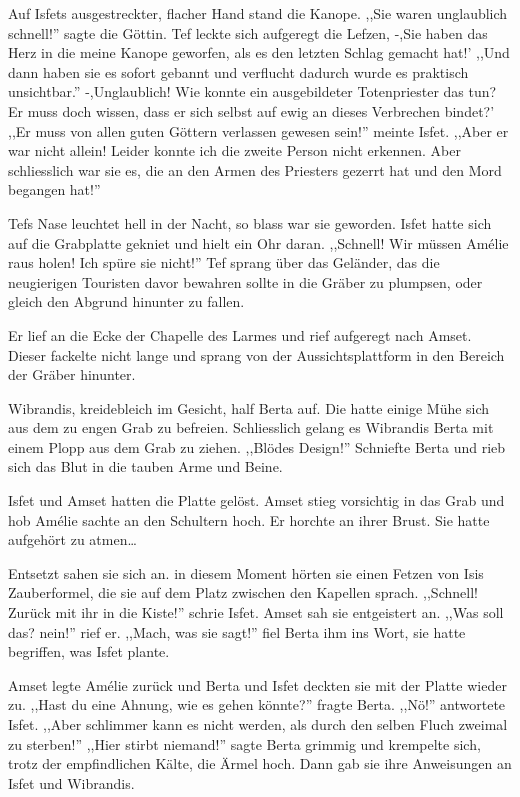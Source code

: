 Auf Isfets ausgestreckter, flacher Hand stand die Kanope. ,,Sie waren unglaublich schnell!'' sagte die Göttin. Tef leckte sich aufgeregt die Lefzen, -,Sie haben das Herz in die meine Kanope geworfen, als es den letzten Schlag gemacht hat!' ,,Und dann haben sie es sofort gebannt und verflucht dadurch wurde es praktisch unsichtbar.'' -,Unglaublich! Wie konnte ein ausgebildeter Totenpriester das tun? Er muss doch wissen, dass er sich selbst auf ewig an dieses Verbrechen bindet?' ,,Er muss von allen guten Göttern verlassen gewesen sein!'' meinte Isfet. ,,Aber er war nicht allein! Leider konnte ich die zweite Person nicht erkennen. Aber schliesslich war sie es, die an den Armen des Priesters gezerrt hat und den Mord begangen hat!''

Tefs Nase leuchtet hell in der Nacht, so blass war sie geworden. Isfet hatte sich auf die Grabplatte gekniet und hielt ein Ohr daran. ,,Schnell! Wir müssen Amélie raus holen! Ich spüre sie nicht!'' Tef sprang über das Geländer, das die neugierigen Touristen davor bewahren sollte in die Gräber zu plumpsen, oder gleich den Abgrund hinunter zu fallen.

Er lief an die Ecke der Chapelle des Larmes und rief aufgeregt nach Amset. Dieser fackelte nicht lange und sprang von der Aussichtsplattform in den Bereich der Gräber hinunter. 

Wibrandis, kreidebleich im Gesicht, half Berta auf. Die hatte einige Mühe sich aus dem zu engen Grab zu befreien. Schliesslich gelang es Wibrandis Berta mit einem Plopp aus dem Grab zu ziehen. ,,Blödes Design!'' Schniefte Berta und rieb sich das Blut in die tauben Arme und Beine.

Isfet und Amset hatten die Platte gelöst. Amset stieg vorsichtig in das Grab und hob Amélie sachte an den Schultern hoch. Er horchte an ihrer Brust. Sie hatte aufgehört zu atmen\dots

Entsetzt sahen sie sich an. in diesem Moment hörten sie einen Fetzen von Isis Zauberformel, die sie auf dem Platz zwischen den Kapellen sprach. ,,Schnell! Zurück mit ihr in die Kiste!'' schrie Isfet. Amset sah sie entgeistert an. ,,Was soll das? nein!'' rief er. ,,Mach, was sie sagt!'' fiel Berta ihm ins Wort, sie hatte begriffen, was Isfet plante. 

Amset legte Amélie zurück und Berta und Isfet deckten sie mit der Platte wieder zu. ,,Hast du eine Ahnung, wie es gehen könnte?'' fragte Berta. ,,Nö!'' antwortete Isfet. ,,Aber schlimmer kann es nicht werden, als durch den selben Fluch zweimal zu sterben!'' ,,Hier stirbt niemand!'' sagte Berta grimmig und krempelte sich, trotz der empfindlichen Kälte, die Ärmel hoch. Dann gab sie ihre Anweisungen an Isfet und Wibrandis.

